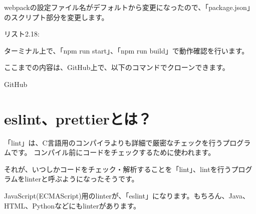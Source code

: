 webpackの設定ファイル名がデフォルトから変更になったので、「package.json」のスクリプト部分を変更します。

\def\startercodeblockfontsize{}
\begin{starterprogram}{リスト2.18: }\end{starterprogram}

ターミナル上で、「npm run start」、「npm run build」で動作確認を行います。

\begin{starternote}[]{}

ここまでの内容は、GitHub上で、以下のコマンドでクローンできます。

\def\startercodeblockfontsize{}
\begin{starterterminal}[]{GitHub}\end{starterterminal}
\end{starternote}

\section{eslint、prettierとは？}
\keeplastskip{
  \label{sec:2-3}
  \label{sec-03lint}
  \par\nobreak
}

「lint」は、C言語用のコンパイラよりも詳細で厳密なチェックを行うプログラムです。
コンパイル前にコードをチェックするために使われます。

\vspace*{\baselineskip}

それが、いつしかコードをチェック・解析することを「lint」、lintを行うプログラムをlinterと呼ぶようになったそうです。

\vspace*{\baselineskip}

JavaScript(ECMAScript)用のlinterが、「eslint」になります。もちろん、Java、HTML、Pythonなどにもlinterがあります。

\vspace*{\baselineskip}

